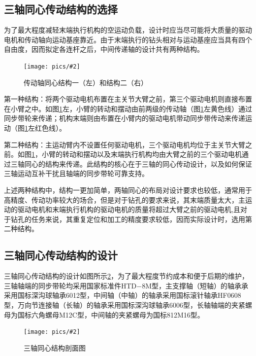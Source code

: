\documentclass[UTF8]{article}%
\newcommand{\p}[4][0.5]{\begin{figure}[h]\centering\texttt{[image: pics/\#2]}\\\caption{#3}\label{#4}\end{figure}}%
\newcommand{\n}{\par}%
\begin{document}
\begin{spacing}{1.5}
	\subsection{三轴同心传动结构的选择}
	为了最大程度减轻末端执行机构的空运动负载，设计时应当尽可能将大质量的驱动电机和传动轴向运动基座靠近。由于末端执行的钻头相对与运动基座应当具有四个自由度，因而拟定各连杆之后，中间传递轴的设计共有两种结构。\n
	\p[0.105]{传动轴同心结构一（左）和结构二（右）.jpg}{传动轴同心结构一（左）和结构二（右）}{tongxiaxis}\n
	第一种结构：将两个驱动电机布置在主关节大臂之前，第三个驱动电机则直接布置在小臂之中。如图\ref{tongxiaxis}左，小臂的转动和摆动由前两级的传动轴（图\ref{tongxiaxis}左黄色线）通过同步带轮来传递；机构末端则由布置在小臂内的驱动电机带动同步带传动来传递运动（图\ref{tongxiaxis}左红色线）。\n
	第二种结构：主运动臂内不设置任何驱动电机，三个驱动电机均位于主关节大臂之前。如图\ref{tongxiaxis}，小臂的转动和摆动以及末端执行机构均由大臂之前的三个驱动电机通过三轴同心的结构来传递。此结构的核心在于三轴的同心传动设计，以及如何保证三轴运动互补干扰且轴端的同步带轮可靠支持。\n
	上述两种结构中，结构一更加简单，两轴同心的布局对设计要求也较低，通常用于高精度、传动功率较大的场合，但是对于钻孔的要求来说，其末端质量太大，主运动的驱动电机和末端执行机构的驱动电机的质量将超过大臂之前的驱动电机,且对于钻孔的任务来说，其重复定位和加工的精度要求较低，因而实际设计时，选用第二种结构。\n
	\subsection{三轴同心传动结构的设计}
	三轴同心传动结构的设计如图所示\ref{sztx}，为了最大程度节约成本和便于后期的维护，三轴轴端的同步带轮均采用国家标准件HTD$-$8M型，主支撑轴（短轴）的轴承承采用国标深沟球轴承6012型，中间轴（中轴）的轴承采用国标滚针轴承HF0608型，万向节连接轴（长轴）的轴承采用国标深沟球轴承6006型，长轴轴端的夹紧螺母为国标六角螺母M12C型，中间轴的夹紧螺母为国标812M16型。\n
	\p[0.4]{三轴同心结构剖面图.png}{三轴同心结构剖面图}{sztx}

\end{spacing}
\end{document}
